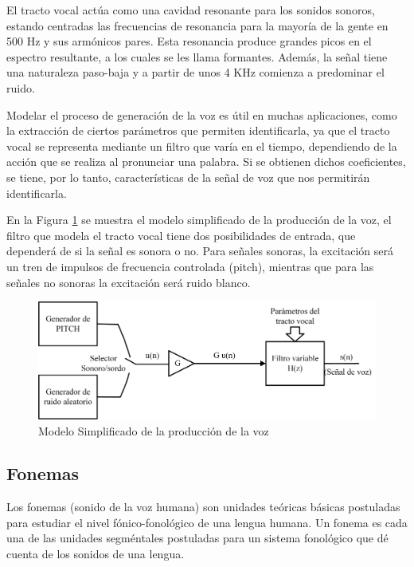 El tracto vocal actúa como una cavidad resonante para los sonidos sonoros, estando centradas las frecuencias de resonancia para la mayoría de la gente en 500 Hz y sus armónicos pares. Esta resonancia produce grandes picos en el espectro resultante, a los cuales se les llama formantes. Además, la señal tiene una naturaleza paso-baja y a partir de unos 4 KHz comienza a predominar el ruido.

Modelar el proceso de generación de la voz es útil en muchas aplicaciones, como la extracción de ciertos parámetros que permiten identificarla, ya que el tracto vocal se representa mediante un filtro que varía en el tiempo, dependiendo de la acción que se realiza al pronunciar una palabra. Si se obtienen dichos coeficientes, se tiene, por lo tanto, características de la señal de voz que nos permitirán identificarla.

En la Figura \ref{fig:modeloSimplificado} se muestra el modelo simplificado de la producción de la voz, el filtro que modela el tracto vocal tiene dos posibilidades de entrada, que dependerá de si la señal es sonora o no. Para señales sonoras, la excitación será un tren de impulsos de frecuencia controlada (pitch), mientras que para las señales no sonoras la excitación será ruido blanco. \cite{SalcedoCherubini2006}

\begin{figure}[H]
	\centering
	\includegraphics[width=0.8\linewidth]{figures/modeloSimplificado}
	\caption{Modelo Simplificado de la producción de la voz}
	\label{fig:modeloSimplificado}
\end{figure}

\subsection{Fonemas}

Los fonemas (sonido de la voz humana) son unidades teóricas básicas postuladas para estudiar el nivel fónico-fonológico de una lengua humana. Un fonema es cada una de las unidades segméntales postuladas para un sistema fonológico que dé cuenta de los sonidos de una lengua.

